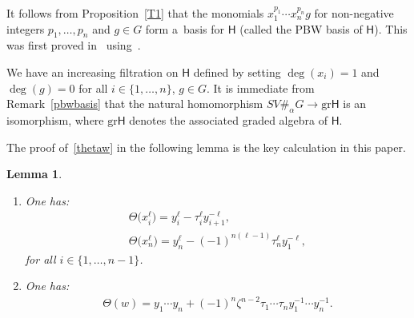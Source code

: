 \documentclass[11pt]{article}
\numberwithin{equation}{section}
\newtheorem{Lemma}[Theorem]{Lemma}
\begin{document}
\begin{Remark}
\label{pbwbasis}
It follows from Proposition~\ref{T1} that the monomials $x_1^{p_1}\cdots x_n^{p_n} g$ for non-negative integers $p_1,
\ldots, p_n$ and $g\in G$ form a~basis for $\mathsf{H}$ (called the PBW basis of $\mathsf{H}$).
This was f\/irst proved in~\cite[Example 2.16]{W} using~\cite[Theorem 2.10]{W}.
\end{Remark}

We have an increasing f\/iltration on $\mathsf{H}$ def\/ined by setting $\deg(x_i)=1$ and $\deg(g)=0$ for all
$i\in\{1,\ldots,n\}$, $g\in G$.
It is immediate from Remark~\ref{pbwbasis} that the natural homomorphism $SV\#_\alpha G \to {\mathrm{gr}} \mathsf{H}$ is
an isomorphism, where ${\mathrm{gr}} \mathsf{H}$ denotes the associated graded algebra of $\mathsf{H}$.

The proof of~\eqref{thetaw} in the following lemma is the key calculation in this paper.

\begin{Lemma}\label{keylemma}\quad
\begin{enumerate}\itemsep=0pt
\item[$(i)$] One has:
\begin{gather}
\Theta\big(x_i^\ell\big) = y_i^\ell - \tau_i^\ell y_{i+1}^{-\ell},
\label{thetaxil}
\\
\Theta\big(x_n^\ell\big) = y_n^\ell - (-1)^{n(\ell-1)} \tau_n^\ell y_1^{-\ell},
\label{thetaxnl}
\end{gather}
for all $i\in \{1,\ldots, n-1\}$.

\item[$(ii)$] One has:
\begin{gather}
\label{thetaw}
\Theta(w) = y_1\cdots y_n + (-1)^n \zeta^{n-2} \tau_1\cdots \tau_n y_1^{-1} \cdots y_n^{-1}.
\end{gather}
\end{enumerate}
\end{Lemma}
\end{document}
